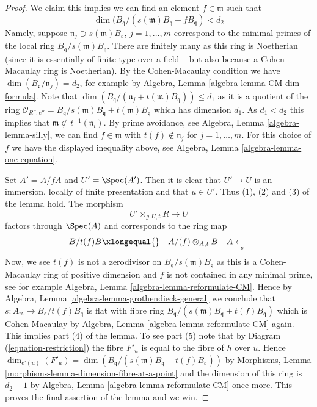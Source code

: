 \begin{proof}
\medskip\noindent
We claim this implies we can find
an element $f \in \mathfrak m$ such that
$$
\dim(B_{\mathfrak q}/(s(\mathfrak m)B_{\mathfrak q} + fB_{\mathfrak q}) < d_2
$$
Namely, suppose $\mathfrak n_j \supset s(\mathfrak m)B_{\mathfrak q}$,
$j = 1, \ldots, m$ correspond to the minimal primes of the local ring
$B_{\mathfrak q}/s(\mathfrak m)B_{\mathfrak q}$.
There are finitely many as this ring is Noetherian (since it is essentially
of finite type over a field -- but also because a Cohen-Macaulay ring is
Noetherian). By the Cohen-Macaulay condition we have
$\dim(B_{\mathfrak q}/\mathfrak n_j) = d_2$, for example by
Algebra, Lemma \ref{algebra-lemma-CM-dim-formula}.
Note that
$\dim(B_{\mathfrak q}/(\mathfrak n_j + t(\mathfrak m)B_{\mathfrak q}))
\leq d_1$
as it is a quotient of the ring
$\mathcal{O}_{R'', e''} =
B_{\mathfrak q}/s(\mathfrak m)B_{\mathfrak q} + t(\mathfrak m)B_{\mathfrak q}$
which has dimension $d_1$. As $d_1 < d_2$ this implies that
$\mathfrak m \not \subset t^{-1}(\mathfrak n_i)$.
By prime avoidance, see
Algebra, Lemma \ref{algebra-lemma-silly},
we can find $f \in \mathfrak m$ with $t(f) \not \in \mathfrak n_j$ for
$j = 1, \ldots, m$. For this choice of $f$ we have
the displayed inequality above, see
Algebra, Lemma \ref{algebra-lemma-one-equation}.

\medskip\noindent
Set $A' = A/fA$ and $U' = \Spec(A')$. Then it is clear that
$U' \to U$ is an immersion, locally of finite presentation
and that $u \in U'$. Thus (1), (2) and (3) of the lemma hold.
The morphism
$$
U' \times_{g, U, t} R \longrightarrow U
$$
factors through $\Spec(A)$ and corresponds to the ring map
$$
\begin{array}{ccc}B/t(f)B \xlongequal{} & A/(f) \otimes_{A, t} B & A \underset{s}{\longleftarrow}\end{array}
$$
Now, we see $t(f)$ is not a zerodivisor on
$B_{\mathfrak q}/s(\mathfrak m)B_{\mathfrak q}$ as this is a
Cohen-Macaulay ring of positive dimension and $f$ is not contained
in any minimal prime, see for example
Algebra, Lemma \ref{algebra-lemma-reformulate-CM}.
Hence by
Algebra, Lemma \ref{algebra-lemma-grothendieck-general}
we conclude that $s : A_{\mathfrak m} \to B_{\mathfrak q}/t(f)B_{\mathfrak q}$
is flat with fibre ring
$B_{\mathfrak q}/(s(\mathfrak m)B_{\mathfrak q} + t(f)B_{\mathfrak q})$
which is Cohen-Macaulay by
Algebra, Lemma \ref{algebra-lemma-reformulate-CM}
again. This implies part (4) of the lemma.
To see part (5) note that by Diagram (\ref{equation-restriction})
the fibre $F'_u$ is equal to the fibre of $h$ over $u$.
Hence
$\dim_{e'(u)}(F'_u) =
\dim(B_{\mathfrak q}/(s(\mathfrak m)B_{\mathfrak q} + t(f)B_{\mathfrak q}))$
by
Morphisms, Lemma \ref{morphisms-lemma-dimension-fibre-at-a-point}
and the dimension of this ring is $d_2 - 1$ by
Algebra, Lemma \ref{algebra-lemma-reformulate-CM}
once more. This proves the final assertion of the lemma and we win.
\end{proof}

